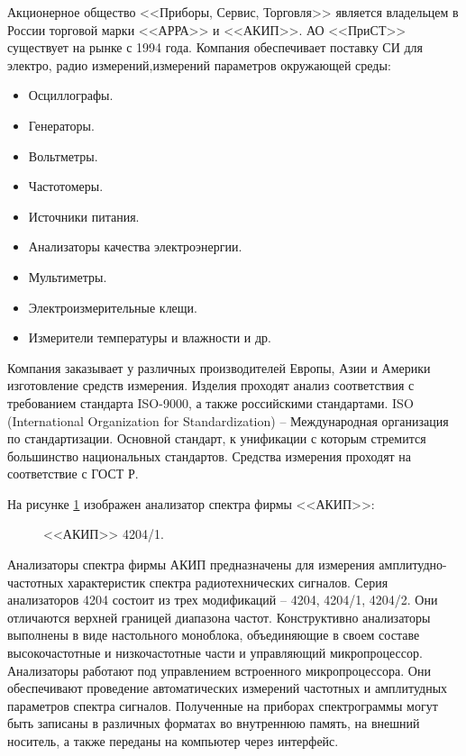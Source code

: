 Акционерное общество <<Приборы, Сервис, Торговля>>\cite{prist}  является владельцем в России торговой марки <<АРРА>> и <<АКИП>>.
АО <<ПриСТ>> существует на рынке с 1994 года.
Компания обеспечивает поставку СИ для электро, радио измерений,измерений параметров окружающей среды:
\begin{itemize}
	\item Осциллографы.
	\item Генераторы.
	\item Вольтметры.
	\item Частотомеры.
	\item Источники питания.
	\item Анализаторы качества электроэнергии.
	\item Мультиметры.
	\item Электроизмерительные клещи.
	\item Измерители температуры и влажности и др.
\end{itemize}

Компания заказывает у различных производителей Европы, Азии и Америки изготовление средств измерения. Изделия проходят анализ соответствия с требованием стандарта ISO-9000, а также российскими стандартами. ISO (International Organization for Standardization) -- Международная организация по стандартизации. Основной стандарт, к унификации с которым стремится большинство национальных стандартов. Средства измерения проходят на соответствие с ГОСТ Р. 

На рисунке \ref{fig:picture8} изображен анализатор спектра фирмы <<АКИП>>:

\begin{figure}[ht]
	\caption{<<АКИП>> 4204/1.}\label{fig:picture8}
\end{figure}

Анализаторы спектра фирмы АКИП предназначены для измерения амплитудно-частотных характеристик спектра радиотехнических сигналов. Серия анализаторов 4204 состоит из трех модификаций – 4204, 4204/1, 4204/2. Они отличаются верхней границей диапазона частот. Конструктивно анализаторы выполнены в виде настольного моноблока, объединяющие в своем составе высокочастотные и низкочастотные части и управляющий микропроцессор. Анализаторы работают под управлением встроенного микропроцессора. Они обеспечивают проведение автоматических измерений частотных и амплитудных параметров спектра сигналов. Полученные на приборах спектрограммы могут быть записаны в различных форматах во внутреннюю память, на внешний носитель, а также переданы на компьютер через интерфейс. 

